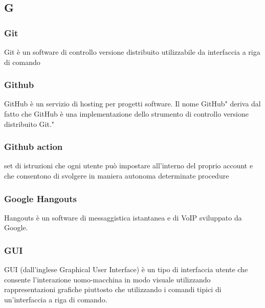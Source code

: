 \subsection*{\textbf{\hfill \Huge{G} \hfill}} 
\subsubsection*{Git}
Git è un software di controllo versione distribuito utilizzabile da interfaccia a riga di comando
\subsubsection*{Github}
GitHub è un servizio di hosting per progetti software. Il nome GitHub" deriva dal fatto che GitHub è una implementazione dello strumento di controllo versione distribuito Git."
\subsubsection*{Github action}
set di istruzioni che ogni utente può impostare all'interno del proprio account e che consentono di svolgere in maniera autonoma determinate procedure
\subsubsection*{Google Hangouts}
Hangouts è un software di messaggistica istantanea e di VoIP sviluppato da Google.
\subsubsection*{GUI}
GUI (dall'inglese Graphical User Interface) è un tipo di interfaccia utente che consente l'interazione uomo-macchina in modo visuale utilizzando rappresentazioni grafiche piuttosto che utilizzando i comandi tipici di un'interfaccia a riga di comando.
